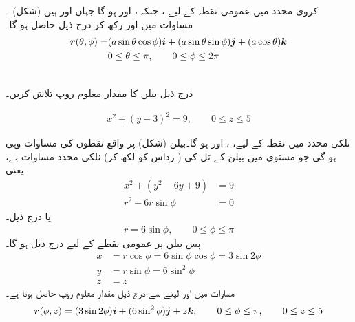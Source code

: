 کروی محدد   میں   عمومی نقطہ کے لیے  ،  جبکہ 
،  اور ہو گا  جہاں  اور  ہیں (شکل) ۔ مساوات  میں اور   رکھ  کر  درج ذیل حاصل ہو گا۔
\begin{align*}
{\ensuremath{{\boldsymbol{r}}}}(\theta,\phi)=&(a\sin\theta\cos\phi){\boldsymbol{i}}+(a\sin\theta\sin\phi){\boldsymbol{j}}+(a\cos\theta){\boldsymbol{k}}\\
& 0\le\theta\le\pi,\qquad0\le\phi\le2\pi
\end{align*}


\\
درج ذیل بیلن کا  مقدار معلوم روپ تلاش کریں۔

\begin{align*}
x^{2}+(y-3)^{2}=9,\qquad 0\le z\le 5
\end{align*}

نلکی محدد میں  نقطہ کے لیے،  ، اور    ہو گا۔بیلن   (شکل) پر   واقع  نقطوں  کی مساوات وہی ہو گی جو   مستوی میں بیلن  کے  تل کی  ( رداس کو   لکھ کر) نلکی محدد مساوات   ہے، یعنی
\begin{align*}
x^{2}+(y^{2}-6y+9)&=9\\
r^{2}-6r\sin\phi&=0
\end{align*}
یا درج ذیل۔
\begin{align*}
r=6\sin\phi,\qquad 0\le\phi\le\pi
\end{align*}
پس بیلن پر  عمومی نقطے کے  لیے درج ذیل ہو گا۔
\begin{align*}
x&=r\cos\phi=6\sin\phi\cos\phi=3\sin 2\phi\\
y&=r\sin\phi=6\sin^{2}\phi\\
z&=z
\end{align*}
مساوات  میں  اور  لینے سے  درج ذیل مقدار معلوم  روپ حاصل ہوتا ہے۔
\begin{align*}
{\ensuremath{{\boldsymbol{r}}}}(\phi,z)=(3\sin 2\phi){\boldsymbol{i}}+(6\sin^{2}\phi){\boldsymbol{j}}+z{\boldsymbol{k}},\qquad 0\le \phi \le \pi,\qquad 0\le z \le 5
\end{align*}


